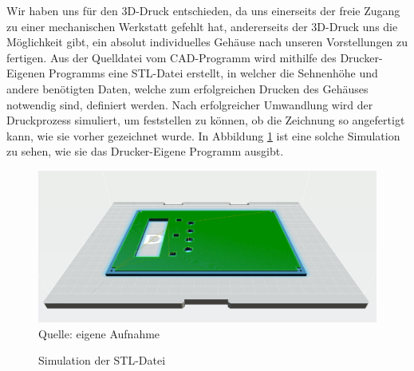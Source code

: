 \label{3D-Druck}

Wir haben uns für den 3D-Druck entschieden, da uns einerseits der freie Zugang zu einer mechanischen Werkstatt gefehlt hat, andererseits der 3D-Druck uns die Möglichkeit gibt, ein absolut individuelles Gehäuse nach unseren Vorstellungen zu fertigen. Aus der Quelldatei vom CAD-Programm wird mithilfe des Drucker-Eigenen Programms eine STL-Datei erstellt, in welcher die Sehnenhöhe und andere benötigten Daten, welche zum erfolgreichen Drucken des Gehäuses notwendig sind, definiert werden. Nach erfolgreicher Umwandlung wird der Druckprozess simuliert, um feststellen zu können, ob die Zeichnung so angefertigt kann, wie sie vorher gezeichnet wurde. In Abbildung \ref{fig:SimSTL} ist eine solche Simulation zu sehen, wie sie das Drucker-Eigene Programm ausgibt.

\begin{figure}[!hbt]
	\centering
	\includegraphics[width=0.9\linewidth]{Images/SimSTL}
	\footnotesize \\Quelle: eigene Aufnahme
	\caption{Simulation der STL-Datei}
	\label{fig:SimSTL}
\end{figure}
